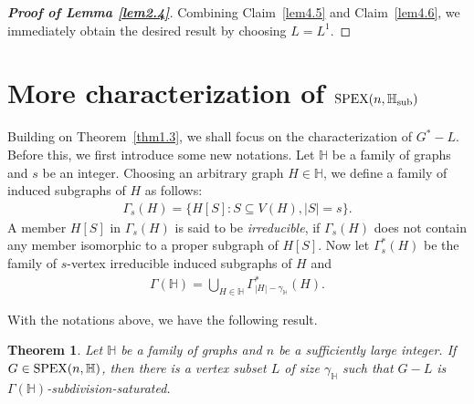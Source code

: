 \documentclass[11pt, a4paper]{article}
\newtheorem{theorem}{Theorem}[section]
\theoremstyle{definition}
\newcommand{\<}{\subseteq}
\begin{document}
\begin{proof}[\bf Proof of Lemma \ref{lem2.4}]
Combining Claim~\ref{lem4.5} and Claim~\ref{lem4.6}, we immediately obtain the desired result by choosing $L=L^1$.
\end{proof}
\section{More characterization of ${\rm SPEX}(n,\mathbb{H}_{\rm sub})$}\label{sec5}

Building on Theorem~\ref{thm1.3}, we shall focus on the characterization of $G^*-L$.
Before this, we first introduce some new notations.
Let $\mathbb{H}$ be a family of graphs and $s$ be an integer. Choosing an arbitrary graph $H \in \mathbb{H}$, we define a family of induced subgraphs of $H$ as follows: 
\begin{align*}
    \Gamma_s(H)=\{H[S]:S\subseteq V(H), |S|=s\}.
\end{align*}
A member $H[S]$ in $\Gamma_s(H)$ is said to be \textit{irreducible}, if $\Gamma_s(H)$ does not contain any member isomorphic to a proper subgraph of $H[S]$.
Now let $\Gamma^*_s(H)$ be the family of $s$-vertex irreducible induced subgraphs of $H$ and
\begin{align*} \Gamma(\mathbb{H})=\bigcup_{H\in\mathbb{H}}\Gamma^*_{|H|-\gamma_\mathbb{H}}(H).
\end{align*}

With the notations above, we have the following result.
\begin{theorem}
\label{cor5.1}
Let $\mathbb{H}$ be a family of graphs and $n$ be a sufficiently large integer.  If $G\in {\rm SPEX}(n,\mathbb{H})$, then there is a vertex subset $L$ of size $\gamma_{\mathbb{H}}$ such that  $G-L$ %
is $\Gamma(\mathbb{H})$-subdivision-saturated. %
\end{theorem}
\end{document}

